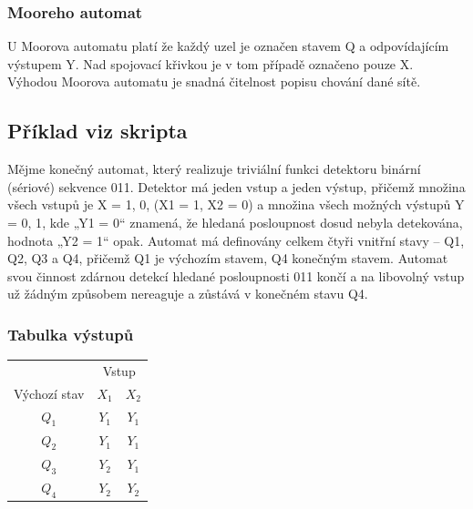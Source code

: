 \subsubsection{Mooreho automat}

U Moorova automatu platí že každý uzel je označen stavem Q a odpovídajícím výstupem Y.
Nad spojovací křivkou je v tom případě označeno pouze X.
Výhodou Moorova automatu je snadná čitelnost popisu chování dané sítě.


\subsection{Příklad viz skripta}


Mějme konečný automat, který realizuje triviální funkci detektoru binární (sériové)
sekvence 011.
Detektor má jeden vstup a jeden výstup, přičemž množina všech vstupů je X = {1, 0}, (X1 = 1, X2 = 0) a množina všech možných výstupů Y = {0, 1}, kde „Y1 = 0“ znamená, že hledaná posloupnost dosud nebyla detekována, hodnota „Y2 = 1“ opak.
Automat má definovány celkem čtyři vnitřní stavy – Q1, Q2, Q3 a Q4, přičemž Q1 je výchozím stavem, Q4 konečným stavem.
Automat svou činnost zdárnou detekcí hledané posloupnosti 011 končí a na libovolný vstup už žádným způsobem nereaguje a zůstává v konečném stavu Q4.

\subsubsection{Tabulka výstupů}

\begin{table}[ht]
    \begin{tabular}{ccc}
    \hline
                 & \multicolumn{2}{c}{Vstup} \\
    Výchozí stav & $X_1$       & $X_2$       \\\hline
    $Q_1$        & $Y_1$       & $Y_1$       \\
    $Q_2$        & $Y_1$       & $Y_1$       \\
    $Q_3$        & $Y_2$       & $Y_1$       \\
    $Q_4$        & $Y_2$       & $Y_2$       \\\hline
    \end{tabular}
\end{table}

